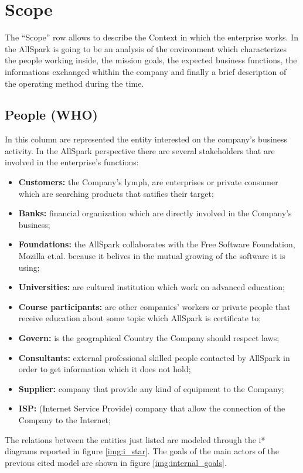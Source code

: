 \section{Scope}
\label{sec:Scope}
The ``Scope'' row allows to describe the Context in which the enterprise works. In the AllSpark is going to be an analysis of the environment which characterizes the people working inside, the mission goals, the expected business functions, the informations exchanged whithin the company and finally a brief description of the operating method during the time.

\subsection{People (WHO)}
\label{subsec:scope[People]}
In this column are represented the entity interested on the company's business activity. In the AllSpark perspective there are several stakeholders that are involved in the enterprise's functions:
\begin{itemize}
 \item {\bf Customers:} the Company's lymph, are enterprises or private consumer which are searching products that satifies their target;
 \item {\bf Banks:} financial organization which are directly involved in the Company's business;
 \item {\bf Foundations:} the AllSpark collaborates with the Free Software Foundation, Mozilla et.al. because it belives in the mutual growing of the software it is using;
 \item {\bf Universities:} are cultural institution which work on advanced education;
 \item {\bf Course participants:} are other companies' workers or private people that receive education about some topic which AllSpark is certificate to;
 \item {\bf Govern:} is the geographical Country the Company should respect laws;
 \item {\bf Consultants:} external professional skilled people contacted by AllSpark in order to get information which it does not hold;
 \item {\bf Supplier:} company that provide any kind of equipment to the Company;
 \item {\bf ISP:} (Internet Service Provide) company that allow the connection of the Company to the Internet;
\end{itemize}

The relations between the entities just listed are modeled through the i* diagrams reported in figure \ref{img:i_star}. The goals of the main actors of the previous cited model are shown in figure \ref{img:internal_goals}.



